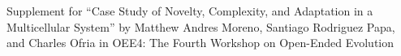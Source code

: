 \clearpage
\onecolumn

\vspace*{\fill}
{\Huge
Supplement for ``Case Study of Novelty, Complexity, and Adaptation in a Multicellular System'' by Matthew Andres Moreno, Santiago Rodriguez Papa, and Charles Ofria
in OEE4: The Fourth Workshop on Open-Ended Evolution}
\vspace*{\fill}

\clearpage

\setcounter{secnumdepth}{2}


